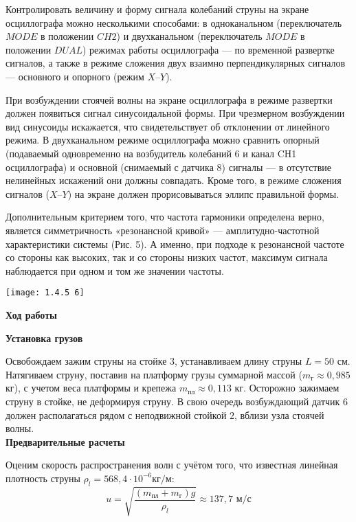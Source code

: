 \documentclass[a4paper,12pt]{article} %
\begin{document}
Контролировать величину и форму сигнала колебаний струны на экране
осциллографа можно несколькими способами: в одноканальном (переключатель $MODE$ в положении $CH2$) и двухканальном (переключатель $MODE$ в положении $DUAL$) режимах работы осциллографа — по временной развертке
сигналов, а также в режиме сложения двух взаимно перпендикулярных сигналов — основного и опорного (режим $X$--$Y$).

При возбуждении стоячей волны на экране осциллографа в режиме развертки должен появиться сигнал синусоидальной формы. При чрезмерном
возбуждении вид синусоиды искажается, что свидетельствует об отклонении
от линейного режима. В двухканальном режиме осциллографа можно сравнить опорный (подаваемый одновременно на возбудитель колебаний 6 и канал CH1 осциллографа) и основной (снимаемый с датчика 8) сигналы — в
отсутствие нелинейных искажений они должны совпадать. Кроме того, в режиме сложения сигналов ($X–Y$) на экране должен прорисовываться эллипс
правильной формы.

Дополнительным критерием того, что частота гармоники определена
верно, является симметричность «резонансной кривой» — амплитудно-частотной характеристики системы (Рис. 5). А именно, при подходе к резонансной частоте со стороны как высоких, так и со стороны низких частот, максимум сигнала наблюдается при одном и том же значении частоты.

\begin{center}
\texttt{[image: 1.4.5 6]}
\end{center}
\newpage

\begin{center}
 \textbf{Ход работы}
\end{center}

{\bf Установка грузов} 

Освобождаем зажим струны на стойке $3$, устанавливаем длину струны $L = 50$ см. Натягиваем струну, поставив на платформу грузы суммарной массой ($m_{\text{г}} \approx 0,985 $ кг), с учетом веса платформы и крепежа $m_{\text{пл}} \approx 0,113$ кг. Осторожно зажимаем струну в стойке, не деформируя струну. В свою очередь возбуждающий датчик $6$ должен располагаться рядом с неподвижной
стойкой $2$, вблизи узла стоячей волны.\\

{\bf Предварительные расчеты}

Оценим скорость распространения волн с учётом того, что известная линейная плотность струны $\rho_l = 568,4 \cdot 10^{-6} \text{кг/м}$:
\[u = \sqrt{\frac{(m_{\text{пл}} + m_{\text{г}})g}{\rho_l}} \approx 137,7\text{ м/с}\]
\end{document}
